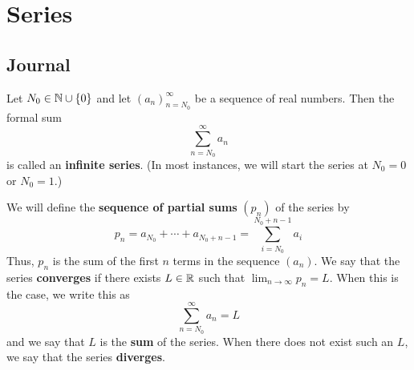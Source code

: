 \documentclass[../main.tex]{subfiles}
\begin{document}
\chapter{Series}\label{sct:16}
\section{Journal}
\begin{definition}\label{dfn:16.1}
    Let $N_0\in\mathbb{N}\cup\{0\}$ and let $(a_n)_{n=N_0}^\infty$ be a sequence of real numbers. Then the formal sum
    \begin{equation*}
        \sum_{n=N_0}^\infty a_n
    \end{equation*}
    is called an \textbf{infinite series}. (In most instances, we will start the series at $N_0=0$ or $N_0=1$.)\par
    We will define the \textbf{sequence of partial sums} $(p_n)$ of the series by
    \begin{equation*}
        p_n = a_{N_0}+\cdots+a_{N_0+n-1} = \sum_{i=N_0}^{N_0+n-1}a_i
    \end{equation*}
    Thus, $p_n$ is the sum of the first $n$ terms in the sequence $(a_n)$. We say that the series \textbf{converges} if there exists $L\in\mathbb{R}$ such that $\lim_{n\to\infty}p_n=L$. When this is the case, we write this as
    \begin{equation*}
        \sum_{n=N_0}^\infty a_n = L
    \end{equation*}
    and we say that $L$ is the \textbf{sum} of the series. When there does not exist such an $L$, we say that the series \textbf{diverges}.
\end{definition}
\end{document}
